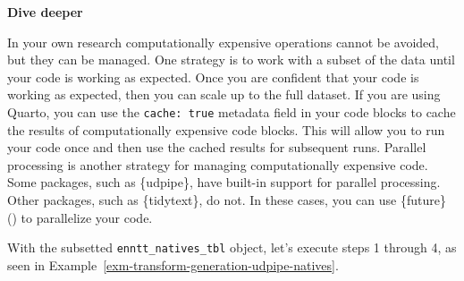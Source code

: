 \documentclass[
  letterpaper,
  krantz1]{latex/krantz-mod}
\theoremstyle{definition}
\theoremstyle{definition}
\theoremstyle{remark}
\begin{document}
\begin{tcolorbox}[enhanced jigsaw, toprule=.15mm, breakable, colback=white, arc=.35mm, left=2mm, colframe=quarto-callout-color-frame, opacityback=0, bottomrule=.15mm, rightrule=.15mm, leftrule=.75mm]

\textbf{ Dive deeper}

In your own research computationally expensive operations cannot be
avoided, but they can be managed. One
strategy is to work with a subset of the data until your code is working
as expected. Once you are confident that your code is working as
expected, then you can scale up to the full dataset. If you are using
Quarto, you can use the \texttt{cache:\ true} metadata field in your
code blocks to cache the results of computationally expensive code
blocks. This will allow you to run your code once and then use the
cached results for subsequent runs. Parallel processing is another
strategy for managing computationally expensive code. Some packages,
such as \{udpipe\}, have built-in support for parallel processing. Other
packages, such as \{tidytext\}, do not. In these cases, you can use
\{future\} () to parallelize
your code.

\end{tcolorbox}

With the subsetted \texttt{enntt\_natives\_tbl} object, let's execute
steps 1 through 4, as seen in
Example~\ref{exm-transform-generation-udpipe-natives}.
\end{document}
